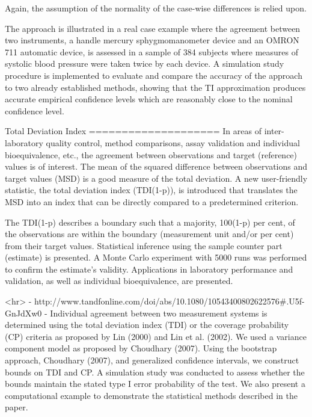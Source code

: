 \documentclass[MAIN.tex]{subfiles}
\begin{document}
	Again, the assumption of the normality of the case-wise differences is relied upon.
	
	The approach is illustrated in a real case example where the agreement between two instruments, a handle mercury sphygmomanometer device and an OMRON 711 automatic device, is assessed in a sample of 384 subjects where measures of systolic blood pressure were taken twice by each device. A simulation study procedure is implemented to evaluate and compare the accuracy of the approach to two already established methods, showing that the TI approximation produces accurate empirical confidence levels which are reasonably close to the nominal confidence level.


Total Deviation Index
====================
In areas of inter-laboratory quality control, method comparisons, assay validation and individual bioequivalence, etc., the agreement between observations and target (reference) values is of interest. The mean of the squared difference between observations and target values (MSD) is a good measure of the total deviation. A new user-friendly statistic, the total deviation index (TDI(1-p)), is introduced that translates the MSD into an index that can be directly compared to a predetermined criterion. 

The TDI(1-p) describes a boundary such that a majority, 100(1-p) per cent, of the observations are within the boundary (measurement unit and/or per cent) from their target values. Statistical inference using the sample counter part (estimate) is presented. A Monte Carlo experiment with 5000 runs was performed to confirm the estimate's validity. Applications in laboratory performance and validation, as well as individual bioequivalence, are presented.

<hr>
- http://www.tandfonline.com/doi/abs/10.1080/10543400802622576#.U5f-GnJdXw0
- 
Individual agreement between two measurement systems is determined using the total deviation index (TDI) or the coverage probability (CP) criteria as proposed by Lin (2000) and Lin et al. (2002). We used a variance component model as proposed by Choudhary (2007). Using the bootstrap approach, Choudhary (2007), and generalized confidence intervals, we construct bounds on TDI and CP. A simulation study was conducted to assess whether the bounds maintain the stated type I error probability of the test. We also present a computational example to demonstrate the statistical methods described in the paper.
\end{document}
